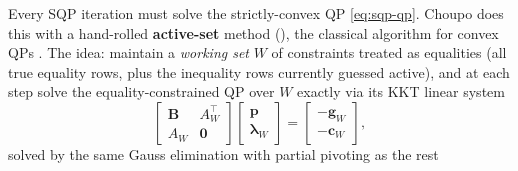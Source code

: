 \documentclass[11pt,a4paper]{article}
\newcommand{\Bv}{\mathbf{B}}                          %
\begin{document}
Every SQP iteration must solve the strictly-convex QP \eqref{eq:sqp-qp}.
Choupo does this with a hand-rolled \textbf{active-set} method
(), the classical algorithm for convex QPs
\cite[Alg.\ 16.3]{NocedalWright}. The idea: maintain a \emph{working
set} $W$ of constraints treated as equalities (all true equality rows,
plus the inequality rows currently guessed active), and at each step
solve the equality-constrained QP over $W$ exactly via its KKT linear
system
\begin{equation}
   \begin{bmatrix} \Bv & A_W^{\!\top} \\ A_W & \mathbf 0 \end{bmatrix}
   \begin{bmatrix} \mathbf p \\ \boldsymbol\lambda_W \end{bmatrix}
   =
   \begin{bmatrix} -\mathbf g_W \\ -\mathbf c_W \end{bmatrix},
   \label{eq:eqqp-kkt}
\end{equation}
solved by the same Gauss elimination with partial pivoting as the rest
\end{document}
